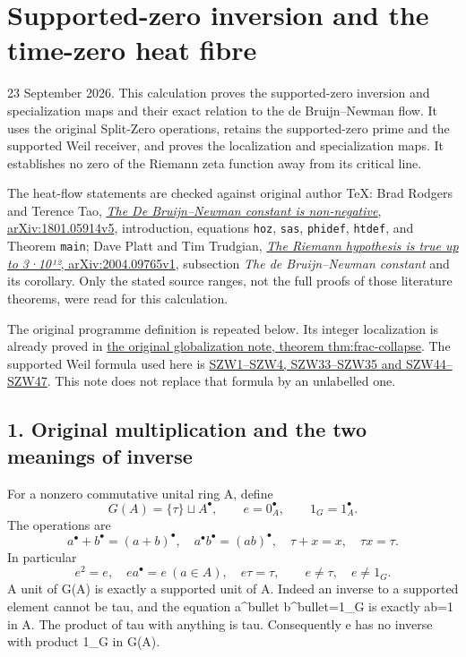 \documentclass[
]{article}
\author{}
\date{}
\begin{document}
\section{Supported-zero inversion and the time-zero heat
fibre}\label{supported-zero-inversion-and-the-time-zero-heat-fibre}

23 September 2026. This calculation proves the supported-zero inversion
and specialization maps and their exact relation to the de
Bruijn--Newman flow. It uses the original Split-Zero operations, retains
the supported-zero prime and the supported Weil receiver, and proves the
localization and specialization maps. It establishes no zero of the
Riemann zeta function away from its critical line.

The heat-flow statements are checked against original author TeX: Brad
Rodgers and Terence Tao,
\href{https://arxiv.org/abs/1801.05914v5}{\emph{The De Bruijn--Newman
constant is non-negative}, arXiv:1801.05914v5}, introduction, equations
\texttt{hoz}, \texttt{sas}, \texttt{phidef}, \texttt{htdef}, and Theorem
\texttt{main}; Dave Platt and Tim Trudgian,
\href{https://arxiv.org/abs/2004.09765v1}{\emph{The Riemann hypothesis
is true up to 3·10¹²}, arXiv:2004.09765v1}, subsection \emph{The de
Bruijn--Newman constant} and its corollary. Only the stated source
ranges, not the full proofs of those literature theorems, were read for
this calculation.

The original programme definition is repeated below. Its integer
localization is already proved in
\href{../supporting_sources/globalization_note.tex}{the original
globalization note, theorem thm:frac-collapse}. The supported Weil
formula used here is
\href{https://github.com/KokunoYumeto/zeta-function-research-reader/blob/4a4238afc992e77aee83b97d38a1a63d283f540c/workbenches/splitzero-tandem/branches/tau-zero-prime-positivity/SUPPORTED_ZERO_PRIME_WEIL_DERIVATION.md\#L15}{SZW1--SZW4,
SZW33--SZW35 and SZW44--SZW47}. This note does not replace that formula
by an unlabelled one.

\subsection{1. Original multiplication and the two meanings of
inverse}\label{original-multiplication-and-the-two-meanings-of-inverse}

For a nonzero commutative unital ring A, define \[
G(A)=\{\tau\}\sqcup A^\bullet,\qquad e=0_A^\bullet,\qquad 1_G=1_A^\bullet.
\tag{HZ1}
\] The operations are \[
a^\bullet+b^\bullet=(a+b)^\bullet,\quad
a^\bullet b^\bullet=(ab)^\bullet,\quad
\tau+x=x,\quad\tau x=\tau.
\tag{HZ2}
\] In particular \[
e^2=e,\quad ea^\bullet=e\ (a\in A),\quad e\tau=\tau,
\qquad e\ne\tau,\quad e\ne1_G.
\tag{HZ3}
\] A unit of G(A) is exactly a supported unit of A. Indeed an inverse to
a supported element cannot be tau, and the equation a\^{}bullet
b\^{}bullet=1\_G is exactly ab=1 in A. The product of tau with anything
is tau. Consequently e has no inverse with product 1\_G in G(A).
\end{document}
